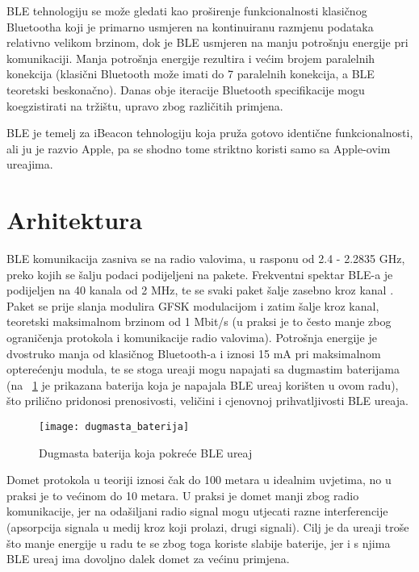 BLE tehnologiju se mo\v{z}e gledati kao pro\v{s}irenje funkcionalnosti klasi\v{c}nog Bluetootha koji je primarno usmjeren na kontinuiranu razmjenu podataka relativno velikom brzinom, dok je BLE usmjeren na manju potro\v{s}nju energije pri komunikaciji. Manja potro\v{s}nja energije rezultira i ve\'{c}im brojem paralelnih konekcija (klasi\v{c}ni Bluetooth mo\v{z}e imati do 7 paralelnih konekcija, a BLE teoretski beskona\v{c}no). Danas obje iteracije Bluetooth specifikacije mogu koegzistirati na tr\v{z}i\v{s}tu, upravo zbog razli\v{c}itih primjena.

BLE je temelj za iBeacon tehnologiju koja pru\v{z}a gotovo identi\v{c}ne funkcionalnosti, ali ju je razvio Apple, pa se shodno tome striktno koristi samo sa Apple-ovim ure\dj ajima.

\section{Arhitektura}

BLE komunikacija zasniva se na radio valovima, u rasponu od 2.4 - 2.2835 GHz, preko kojih se \v{s}alju podaci podijeljeni na pakete. Frekventni spektar BLE-a je podijeljen na 40 kanala od 2 MHz, te se svaki paket \v{s}alje zasebno kroz kanal \cite{ble_introduction}. Paket se prije slanja modulira GFSK modulacijom i zatim \v{s}alje kroz kanal, teoretski maksimalnom brzinom od 1 Mbit/s (u praksi je to \v{c}esto manje zbog ograni\v{c}enja protokola i komunikacije radio valovima). Potro\v{s}nja energije je dvostruko manja od klasi\v{c}nog Bluetooth-a i iznosi 15 mA pri maksimalnom optere\'{c}enju modula, te se stoga ure\dj aji mogu napajati sa dugmastim baterijama (na ~\ref{fig:ble_baterija} je prikazana baterija koja je napajala BLE ure\dj aj kori\v{s}ten u ovom radu), \v{s}to prili\v{c}no pridonosi prenosivosti, veli\v{c}ini i cjenovnoj prihvatljivosti BLE ure\dj aja.


\begin{figure}[!htbp]
	\begin{center}
 \texttt{[image: dugmasta\_baterija]}
 \caption{Dugmasta baterija koja pokre\'{c}e BLE ure\dj aj}
 \label{fig:ble_baterija}
	\end{center}
\end{figure}

Domet protokola u teoriji iznosi \v{c}ak do 100 metara u idealnim uvjetima, no u praksi je to ve\'{c}inom do 10 metara. U praksi je domet manji zbog radio komunikacije, jer na oda\v{s}iljani radio signal mogu utjecati razne interferencije (apsorpcija signala u medij kroz koji prolazi, drugi signali). Cilj je da ure\dj aji tro\v{s}e \v{s}to manje energije u radu te se zbog toga koriste slabije baterije, jer i s njima BLE ure\dj aj ima dovoljno dalek domet za ve\'{c}inu primjena.


